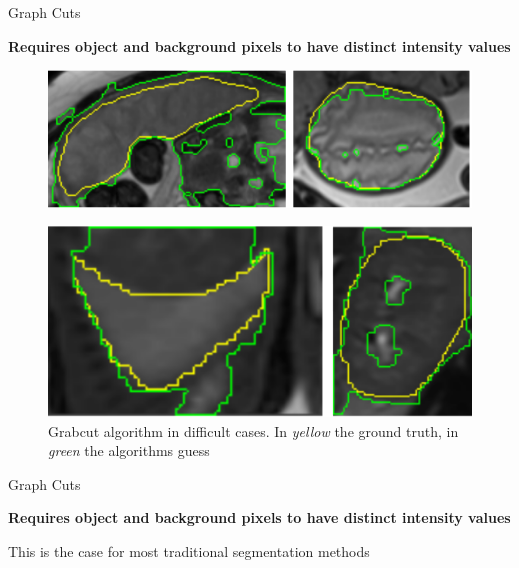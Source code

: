 \documentclass[10pt]{beamer}
\begin{document}
\begin{frame}[fragile]{Graph Cuts}

  \textbf{Requires object and background pixels to have distinct intensity values}
   
  \begin{figure}[h!]
    \centering
    \includegraphics[scale=0.25]{pictures/grabcuts1}
  \end{figure}

     
  \begin{figure}[h!]
    \centering
    \includegraphics[scale=0.25]{pictures/grabcuts2}
    \caption{Grabcut algorithm in difficult cases. In \textit{yellow} the ground truth, in \textit{green}
    the algorithms guess \cite{BIFSeg}}
    \label{fig:minCut}
  \end{figure}
  
\end{frame}


\begin{frame}[fragile]{Graph Cuts}

  \textbf{Requires object and background pixels to have distinct intensity values}
   
  This is the case for most traditional segmentation methods
  
\end{frame}


\end{document}
